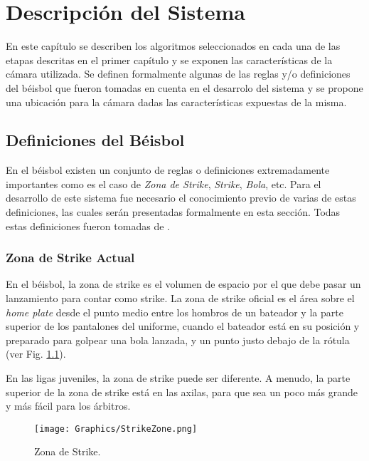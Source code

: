 \chapter{Descripción del Sistema}\label{chapter:description}

En este capítulo se describen los algoritmos seleccionados en cada una de las etapas descritas en el primer capítulo y se exponen las características de la cámara utilizada. Se definen formalmente algunas de las reglas y/o definiciones del béisbol que fueron tomadas en cuenta en el desarrolo del sistema y se propone una ubicación para la cámara dadas las características expuestas de la misma.

\section{Definiciones del Béisbol}

En el béisbol existen un conjunto de reglas o definiciones extremadamente importantes como es el caso de \textit{Zona de Strike}, \textit{Strike}, \textit{Bola}, etc. Para el desarrollo de este sistema fue necesario el conocimiento previo de varias de estas definiciones, las cuales serán presentadas formalmente en esta sección. Todas estas definiciones fueron tomadas de \cite{MLB}.

\subsection{Zona de Strike Actual}

En el béisbol, la zona de strike es el volumen de espacio por el que debe pasar un lanzamiento para contar como strike. La zona de strike oficial es el área sobre el \textit{home plate} desde el punto medio entre los hombros de un bateador y la parte superior de los pantalones del uniforme, cuando el bateador está en su posición y preparado para golpear una bola lanzada, y un punto justo debajo de la rótula (ver Fig. \ref{fig:StrikeZone}).

En las ligas juveniles, la zona de strike puede ser diferente. A menudo, la parte superior de la zona de strike está en las axilas, para que sea un poco más grande y más fácil para los árbitros.

\begin{figure}[!h]
    \centering
    \texttt{[image: Graphics/StrikeZone.png]}
    \caption{Zona de Strike.}
    \label{fig:StrikeZone}
\end{figure}

